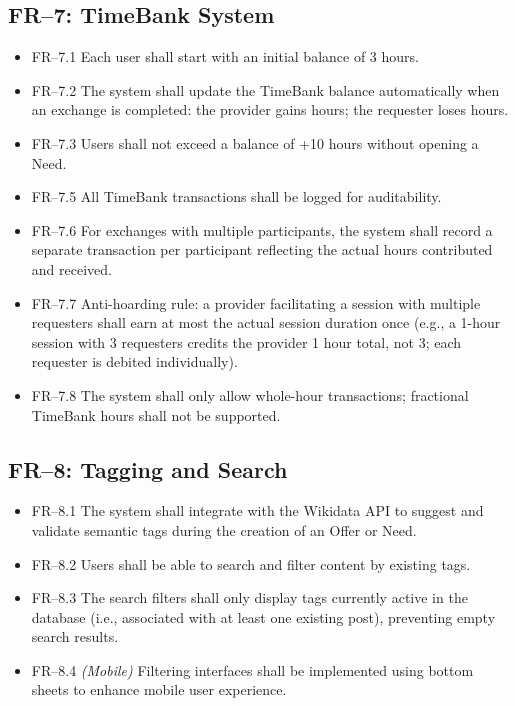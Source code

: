 \documentclass[11pt,a4paper]{report}
\begin{document}
\subsection{FR--7: TimeBank System}
\begin{itemize}
    \item FR--7.1 Each user shall start with an initial balance of 3 hours.
    \item FR--7.2 The system shall update the TimeBank balance automatically when an exchange is completed: the provider gains hours; the requester loses hours.
    \item FR--7.3 Users shall not exceed a balance of +10 hours without opening a Need.
    \item FR--7.5 All TimeBank transactions shall be logged for auditability.
    \item FR--7.6 For exchanges with multiple participants, the system shall record a separate transaction per participant reflecting the actual hours contributed and received.
    \item FR--7.7 Anti-hoarding rule: a provider facilitating a session with multiple requesters shall earn at most the actual session duration once (e.g., a 1-hour session with 3 requesters credits the provider 1 hour total, not 3; each requester is debited individually).
    \item FR--7.8 The system shall only allow whole-hour transactions; fractional TimeBank hours shall not be supported.
\end{itemize}

\subsection{FR--8: Tagging and Search}
\begin{itemize}
    \item FR--8.1 The system shall integrate with the Wikidata API to suggest and validate semantic tags during the creation of an Offer or Need.
    \item FR--8.2 Users shall be able to search and filter content by existing tags.
    \item FR--8.3 The search filters shall only display tags currently active in the database (i.e., associated with at least one existing post), preventing empty search results.
    \item FR--8.4 \textit{(Mobile)} Filtering interfaces shall be implemented using bottom sheets to enhance mobile user experience.
\end{itemize}
\end{document}
